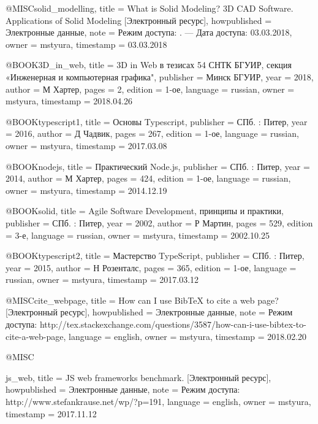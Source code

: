 
@MISC{solid_modelling,
  title = {What is Solid Modeling? 3D CAD Software. Applications of Solid Modeling [Электронный ресурс]},
  howpublished = {Электронные данные},
  note = {Режим доступа: . --- Дата
	доступа: 03.03.2018},
  owner = {mstyura},
  timestamp = {03.03.2018}
}

@BOOK{3D_in_web,
  title = {3D in Web в тезисах 54 СНТК БГУИР, секция «Инженерная и компьютерная графика"},
  publisher = {Минск БГУИР},
  year = {2018},
  author = {М Хартер},
  pages = {2},
  edition = {1-ое},
  language = {russian},
  owner = {mstyura},
  timestamp = {2018.04.26}
}

@BOOK{typescript1,
  title = {Основы Typescript},
  publisher = {СПб. : Питер},
  year = {2016},
  author = {Д Чадвик},
  pages = {267},
  edition = {1-ое},
  language = {russian},
  owner = {mstyura},
  timestamp = {2017.03.08}
}

@BOOK{nodejs,
  title = {Практический Node.js},
  publisher = {СПб. : Питер},
  year = {2014},
  author = {М Хартер},
  pages = {424},
  edition = {1-ое},
  language = {russian},
  owner = {mstyura},
  timestamp = {2014.12.19}
}

@BOOK{solid,
  title = {Agile Software Development, принципы и практики},
  publisher = {СПб. : Питер},
  year = {2002},
  author = {Р Мартин},
  pages = {529},
  edition = {3-е},
  language = {russian},
  owner = {mstyura},
  timestamp = {2002.10.25}
}

@BOOK{typescript2,
  title = {Мастерство TypeScript},
  publisher = {СПб. : Питер},
  year = {2015},
  author = {Н Розенталс},
  pages = {365},
  edition = {1-ое},
  language = {russian},
  owner = {mstyura},
  timestamp = {2017.03.12}
}

@MISC{cite_webpage,
  title = {How can I use BibTeX to cite a web page? [Электронный ресурс]},
  howpublished = {Электронные данные},
  note = {Режим доступа: http://tex.stackexchange.com/questions/3587/how-can-i-use-bibtex-to-cite-a-web-page},
  language = {english},
  owner = {mstyura},
  timestamp = {2018.02.20}
}

@MISC{js_web,
  title = {JS web frameworks benchmark. [Электронный ресурс]},
  howpublished = {Электронные данные},
  note = {Режим доступа: http://www.stefankrause.net/wp/?p=191},
  language = {english},
  owner = {mstyura},
  timestamp = {2017.11.12} 
  
  }

